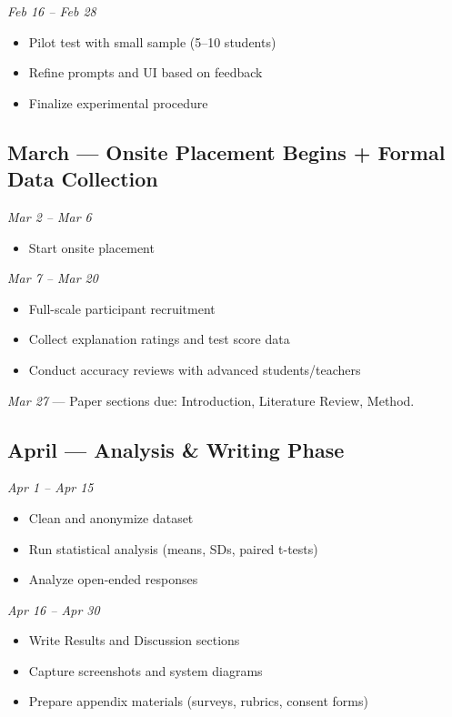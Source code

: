 \documentclass[11pt]{article}
\begin{document}
\textit{Feb 16 -- Feb 28}
\begin{itemize}[leftmargin=1.6em,nosep]
  \item Pilot test with small sample (5--10 students)
  \item Refine prompts and UI based on feedback
  \item Finalize experimental procedure
\end{itemize}

\subsection*{March --- Onsite Placement Begins + Formal Data Collection}

\textit{Mar 2 -- Mar 6}
\begin{itemize}[leftmargin=1.6em,nosep]
  \item Start onsite placement
\end{itemize}

\textit{Mar 7 -- Mar 20}
\begin{itemize}[leftmargin=1.6em,nosep]
  \item Full-scale participant recruitment
  \item Collect explanation ratings and test score data
  \item Conduct accuracy reviews with advanced students/teachers
\end{itemize}

\textit{Mar 27} --- Paper sections due: Introduction, Literature Review, Method.

\subsection*{April --- Analysis \& Writing Phase}

\textit{Apr 1 -- Apr 15}
\begin{itemize}[leftmargin=1.6em,nosep]
  \item Clean and anonymize dataset
  \item Run statistical analysis (means, SDs, paired t-tests)
  \item Analyze open-ended responses
\end{itemize}

\textit{Apr 16 -- Apr 30}
\begin{itemize}[leftmargin=1.6em,nosep]
  \item Write Results and Discussion sections
  \item Capture screenshots and system diagrams
  \item Prepare appendix materials (surveys, rubrics, consent forms)
\end{itemize}
\end{document}

